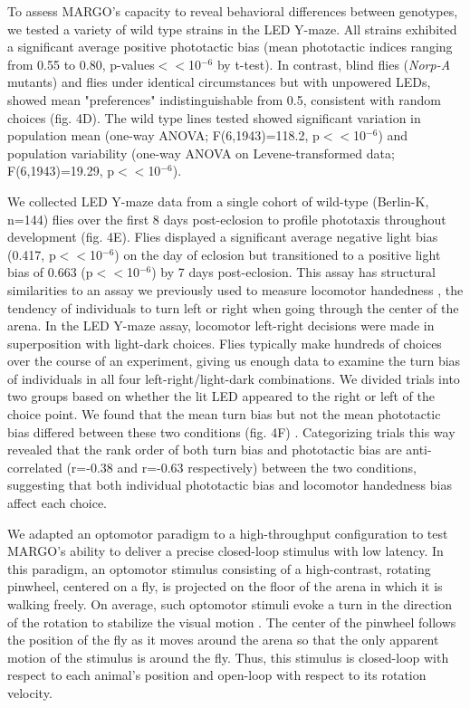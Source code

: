 \documentclass[12pt,letterpaper]{article}
\begin{document}
To assess MARGO's capacity to reveal behavioral differences between genotypes, we tested a variety of wild type strains in the LED Y-maze. All strains exhibited a significant average positive phototactic bias (mean phototactic indices ranging from 0.55 to 0.80, p-values$<<$10$^{-6}$ by t-test). In contrast, blind flies (\emph{Norp-A} mutants) and flies under identical circumstances but with unpowered LEDs, showed mean "preferences" indistinguishable from 0.5, consistent with random choices (fig. 4D). The wild type lines tested showed significant variation in population mean (one-way ANOVA; F(6,1943)=118.2, p$<<$10$^{-6}$) and population variability (one-way ANOVA on Levene-transformed data; F(6,1943)=19.29, p$<<$10$^{-6}$).

We collected LED Y-maze data from a single cohort of wild-type (Berlin-K, n=144) flies over the first 8 days post-eclosion to profile phototaxis throughout development (fig. 4E). Flies displayed a significant average negative light bias (0.417, p$<<$10$^{-6}$) on the day of eclosion but transitioned to a positive light bias of 0.663 (p$<<$10$^{-6}$) by 7 days post-eclosion. This assay has structural similarities to an assay we previously used to measure locomotor handedness \cite{Buchanan_Neuronal_2015}, the tendency of individuals to turn left or right when going through the center of the arena. In the LED Y-maze assay, locomotor left-right decisions were made in superposition with light-dark choices. Flies typically make hundreds of choices over the course of an experiment, giving us enough data to examine the turn bias of individuals in all four left-right/light-dark combinations. We divided trials into two groups based on whether the lit LED appeared to the right or left of the choice point. We found that the mean turn bias but not the mean phototactic bias differed between these two conditions (fig. 4F) \cite{Ayroles_Behavioral_2015}. Categorizing trials this way revealed that the rank order of both turn bias and phototactic bias are anti-correlated (r=-0.38 and r=-0.63 respectively) between the two conditions, suggesting that both individual phototactic bias and locomotor handedness bias affect each choice. 

We adapted an optomotor paradigm \cite{Cruz572792} to a high-throughput configuration to test MARGO's ability to deliver a precise closed-loop stimulus with low latency. In this paradigm, an optomotor stimulus consisting of a high-contrast, rotating pinwheel, centered on a fly, is projected on the floor of the arena in which it is walking freely. On average, such optomotor stimuli evoke a turn in the direction of the rotation to stabilize the visual motion \cite{Gtz_Visual_1973}. The center of the pinwheel follows the position of the fly as it moves around the arena so that the only apparent motion of the stimulus is around the fly. Thus, this stimulus is closed-loop with respect to each animal's position and open-loop with respect to its rotation velocity.
\end{document}
